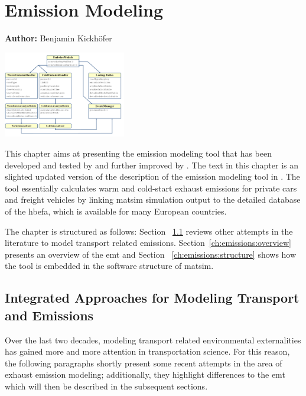 \chapter{Emission Modeling}
\label{ch:emissions}

\hfill \textbf{Author:} Benjamin Kickh\"ofer

\begin{center} \includegraphics[width=0.4\textwidth, angle=0]{extending/figures/emissionToolOverview_pdfa.pdf} \end{center}

%
{\citet{...}}

This chapter aims at presenting the emission modeling tool that has been developed and tested by \citet{HuelsmannEtAl_LAS_2011} and further improved by \citet{KickhoeferEtAl_VanoutriveVerhetsel_2013}. The text in this chapter is an slighted updated version of the description of the emission modeling tool in \citet{Kickhoefer_PhDThesis_2014}.
%
The tool essentially calculates warm and cold-start exhaust emissions for private cars and freight vehicles by linking \gls{matsim} simulation output to the detailed database of the \gls{hbefa}, which is available for many European countries.

The chapter is structured as follows:
%
Section ~\ref{ch:emissions:relatedWork} reviews other attempts in the literature to model transport related emissions. Section~\ref{ch:emissions:overview} presents an overview of the \gls{emt} and Section ~\ref{ch:emissions:structure} shows how the tool is embedded in the software structure of \gls{matsim}.

\section{Integrated Approaches for Modeling Transport and Emissions}
\label{ch:emissions:relatedWork}
%
%
Over the last two decades, modeling transport related environmental 
externalities has gained more and more attention in transportation science.
%
For this reason, the following paragraphs shortly present some recent 
attempts in the area of exhaust emission modeling; additionally, they 
highlight differences to the \gls{emt} which will then be described in the 
subsequent sections.

